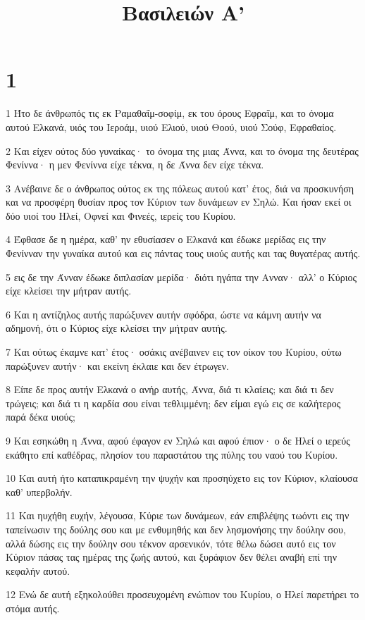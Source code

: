 

\title{Βασιλειών Α'}


\chapter{1}

\par 1 Ήτο δε άνθρωπός τις εκ Ραμαθαΐμ-σοφίμ, εκ του όρους Εφραΐμ, και το όνομα αυτού Ελκανά, υιός του Ιεροάμ, υιού Ελιού, υιού Θοού, υιού Σούφ, Εφραθαίος.
\par 2 Και είχεν ούτος δύο γυναίκας· το όνομα της μιας Άννα, και το όνομα της δευτέρας Φενίννα· η μεν Φενίννα είχε τέκνα, η δε Άννα δεν είχε τέκνα.
\par 3 Ανέβαινε δε ο άνθρωπος ούτος εκ της πόλεως αυτού κατ' έτος, διά να προσκυνήση και να προσφέρη θυσίαν προς τον Κύριον των δυνάμεων εν Σηλώ. Και ήσαν εκεί οι δύο υιοί του Ηλεί, Οφνεί και Φινεές, ιερείς του Κυρίου.
\par 4 Έφθασε δε η ημέρα, καθ' ην εθυσίασεν ο Ελκανά και έδωκε μερίδας εις την Φενίνναν την γυναίκα αυτού και εις πάντας τους υιούς αυτής και τας θυγατέρας αυτής.
\par 5 εις δε την Άνναν έδωκε διπλασίαν μερίδα· διότι ηγάπα την Ανναν· αλλ' ο Κύριος είχε κλείσει την μήτραν αυτής.
\par 6 Και η αντίζηλος αυτής παρώξυνεν αυτήν σφόδρα, ώστε να κάμνη αυτήν να αδημονή, ότι ο Κύριος είχε κλείσει την μήτραν αυτής.
\par 7 Και ούτως έκαμνε κατ' έτος· οσάκις ανέβαινεν εις τον οίκον του Κυρίου, ούτω παρώξυνεν αυτήν· και εκείνη έκλαιε και δεν έτρωγεν.
\par 8 Είπε δε προς αυτήν Ελκανά ο ανήρ αυτής, Άννα, διά τι κλαίεις; και διά τι δεν τρώγεις; και διά τι η καρδία σου είναι τεθλιμμένη; δεν είμαι εγώ εις σε καλήτερος παρά δέκα υιούς;
\par 9 Και εσηκώθη η Άννα, αφού έφαγον εν Σηλώ και αφού έπιον· ο δε Ηλεί ο ιερεύς εκάθητο επί καθέδρας, πλησίον του παραστάτου της πύλης του ναού του Κυρίου.
\par 10 Και αυτή ήτο καταπικραμένη την ψυχήν και προσηύχετο εις τον Κύριον, κλαίουσα καθ' υπερβολήν.
\par 11 Και ηυχήθη ευχήν, λέγουσα, Κύριε των δυνάμεων, εάν επιβλέψης τωόντι εις την ταπείνωσιν της δούλης σου και με ενθυμηθής και δεν λησμονήσης την δούλην σου, αλλά δώσης εις την δούλην σου τέκνον αρσενικόν, τότε θέλω δώσει αυτό εις τον Κύριον πάσας τας ημέρας της ζωής αυτού, και ξυράφιον δεν θέλει αναβή επί την κεφαλήν αυτού.
\par 12 Ενώ δε αυτή εξηκολούθει προσευχομένη ενώπιον του Κυρίου, ο Ηλεί παρετήρει το στόμα αυτής.
